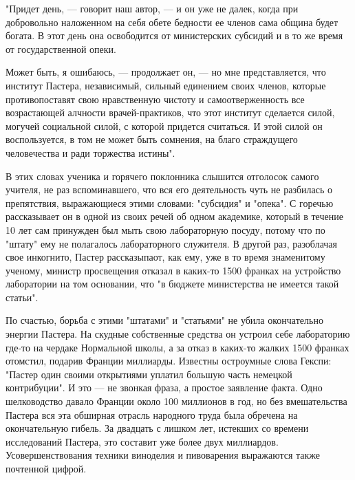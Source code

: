 "Придет день, --- говорит наш автор, ---  и он уже не далек, когда при
добровольно наложенном  на себя обете  бедности ее членов  сама община
будет богата. В этот день она освободится от министерских субсидий и в
то же время от государственной опеки.

Может быть, я ошибаюсь, ---  продолжает он, --- но мне представляется,
что  институт Пастера,  независимый, сильный  единением своих  членов,
которые противопоставят свою  нравственную чистоту и самоотверженность
все   возрастающей  алчности   врачей-практиков,  что   этот  институт
сделается  силой,   могучей  социальной  силой,  с   которой  придется
считаться.  И  этой  силой  он  воспользуется, в  том  не  может  быть
сомнения, на благо страждущего человечества и ради торжества истины".

В этих словах ученика и  горячего поклонника слышится отголосок самого
учителя,  не  раз вспоминавшего,  что  вся  его деятельность  чуть  не
разбилась  о препятствия,  выражающиеся  этими  словами: "субсидия"  и
"опека".  С  горечью  рассказывает  он  в  одной  из  своих  речей  об
одном  академике, который  в течение  10  лет сам  принужден был  мыть
свою  лабораторную посуду,  потому что  по "штату"  ему не  полагалось
лабораторного  служителя. В  другой  раз,  разоблачая свое  инкогнито,
Пастер  рассказыпаот, как  ему, уже  в то  время знаменитому  ученому,
министр  просвещения отказал  в  каких-то 1500  франках на  устройство
лаборатории на том  основании, что "в бюджете  министерства не имеется
такой статьи".

По  счастью,   борьба  с  этими   "штатами"  и  "статьями"   не  убила
окончательно  энергии  Пастера.  На скудные  собственные  средства  он
устроил  себе лабораторию  где-то на  чердаке Нормальной  школы, а  за
отказ  в  каких-то  жалких  1500  франках  отомстил,  подарив  Франции
миллиарды.  Известны  остроумные  слова Гекспи:  "Пастер  один  своими
открытиями уплатил большую  часть немецкой контрибуции". И  это --- не
звонкая  фраза, а  простое заявление  факта. Одно  шелководство давало
Франции около  100 миллионов в  год, но без вмешательства  Пастера вся
эта обширная  отрасль народного  труда была обречена  на окончательную
гибель. За  двадцать с  лишком лет,  истекших со  времени исследований
Пастера, это  составит уже  более двух  миллиардов. Усовершенствования
техники виноделия и пивоварения выражаются также почтенной цифрой.

